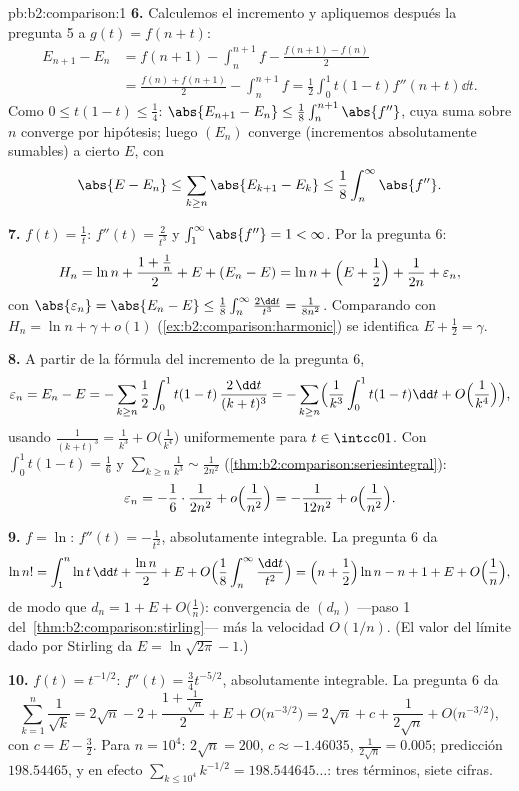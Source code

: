\begin{solution}{pb:b2:comparison:1}
\textbf{6.} Calculemos el incremento y apliquemos después la
pregunta 5 a $g(t) = f(n + t)$:
\begin{align*}
E_{n+1} - E_n
&= f(n{+}1) - \int_n^{n+1}\!f - \frac{f(n{+}1) - f(n)}2 \\
&= \frac{f(n) + f(n{+}1)}2 - \int_n^{n+1}\!f
= \frac12\int_0^1 t(1-t)f''(n+t)\dd t .
\end{align*}
Como $0 \leq t(1-t) \leq \frac14$: $\abs{E_{n+1} - E_n} \leq
\frac18\int_n^{n+1}\abs{f''}$, cuya suma sobre $n$ converge por
hipótesis; luego $(E_n)$ converge (incrementos absolutamente
sumables) a cierto $E$, con
\[
\abs{E - E_n} \leq \sum_{k\geq n}\abs{E_{k+1} - E_k} \leq
\frac18\int_n^\infty\abs{f''} .
\]

\textbf{7.} $f(t) = \frac1t$: $f''(t) = \frac2{t^3}$ y
$\int_1^\infty\abs{f''} = 1 < \infty$. Por la pregunta 6:
\[
H_n = \ln n + \frac{1 + \frac1n}{2} + E + (E_n - E)
= \ln n + \Bigl(E + \frac12\Bigr) + \frac1{2n} +
\varepsilon_n,
\]
con $\abs{\varepsilon_n} = \abs{E_n - E} \leq
\frac18\int_n^\infty\frac{2\dd t}{t^3} = \frac1{8n^2}$.
Comparando con $H_n = \ln n + \gamma + o(1)$
(\cref{ex:b2:comparison:harmonic}) se identifica $E + \frac12 =
\gamma$.

\textbf{8.} A partir de la fórmula del incremento de la pregunta
6,
\[
\varepsilon_n = E_n - E = -\sum_{k\geq n}\frac12\int_0^1
t(1-t)\,\frac{2\,\dd t}{(k+t)^3}
= -\sum_{k \geq n}\Bigl(\frac1{k^3}\int_0^1t(1-t)\dd t +
O\Bigl(\frac1{k^4}\Bigr)\Bigr),
\]
usando $\frac{1}{(k+t)^3} = \frac1{k^3} +
O\bigl(\frac1{k^4}\bigr)$ uniformemente para $t \in \intcc01$.
Con $\int_0^1 t(1-t) = \frac16$ y $\sum_{k\geq n}\frac1{k^3}
\sim \frac{1}{2n^2}$ (\cref{thm:b2:comparison:seriesintegral}):
\[
\varepsilon_n = -\frac16\cdot\frac{1}{2n^2} +
o\Bigl(\frac1{n^2}\Bigr) = -\frac{1}{12n^2} +
o\Bigl(\frac{1}{n^2}\Bigr).
\]

\textbf{9.} $f = \ln$: $f''(t) = -\frac1{t^2}$, absolutamente
integrable. La pregunta 6 da
\[
\ln n! = \int_1^n\ln t\,\dd t + \frac{\ln n}2 + E + O\Bigl(
\frac1{8}\int_n^\infty\frac{\dd t}{t^2}\Bigr)
= \Bigl(n + \frac12\Bigr)\ln n - n + 1 + E +
O\Bigl(\frac1n\Bigr),
\]
de modo que $d_n = 1 + E + O\bigl(\frac1n\bigr)$: convergencia de
$(d_n)$ ---paso 1 del~\cref{thm:b2:comparison:stirling}--- más la
velocidad $O(1/n)$. (El valor del límite dado por Stirling da $E
= \ln\sqrt{2\pi} - 1$.)

\textbf{10.} $f(t) = t^{-1/2}$: $f''(t) = \frac34 t^{-5/2}$,
absolutamente integrable. La pregunta 6 da
\[
\sum_{k=1}^n \frac1{\sqrt k}
= 2\sqrt n - 2 + \frac{1 + \frac1{\sqrt n}}2 + E +
O\bigl(n^{-3/2}\bigr)
= 2\sqrt n + c + \frac{1}{2\sqrt n} +
O\bigl(n^{-3/2}\bigr),
\]
con $c = E - \frac32$. Para $n = 10^4$: $2\sqrt n = 200$, $c
\approx -1.46035$, $\frac1{2\sqrt n} = 0.005$; predicción
$198.54465$, y en efecto $\sum_{k\leq10^4}k^{-1/2} =
198.544645\dots$: tres términos, siete cifras.


\end{solution}
